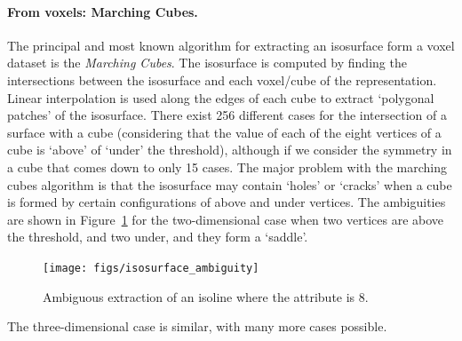 \paragraph{From voxels: Marching Cubes.} 
The principal and most known algorithm for extracting an isosurface form a voxel dataset is the \emph{Marching Cu\-bes}. 
The isosurface is computed by finding the intersections between the isosurface and each voxel/cube of the representation. 
Linear interpolation is used along the edges of each cube to extract `polygonal patches' of the isosurface. 
There exist 256 different cases for the intersection of a surface with a cube (considering that the value of each of the eight vertices of a cube is `above' of `under' the threshold), although if we consider the symmetry in a cube that comes down to only 15 cases. 
The major problem with the marching cubes algorithm is that the isosurface may contain `holes' or `cracks' when a cube is formed by certain configurations of above and under vertices. 
The ambiguities are shown in Figure~\ref{fig:isosurface_ambiguity} for the two-dimensional case when two vertices are above the threshold, and two under, and they form a `saddle'.
\begin{figure}
  \centering
  \texttt{[image: figs/isosurface\_ambiguity]}
  \caption[Ambiguous extraction of an isoline]{Ambiguous extraction of an isoline where the attribute is 8.}%
\label{fig:isosurface_ambiguity}
\end{figure}
The three-dimensional case is similar, with many more cases possible. 

%

